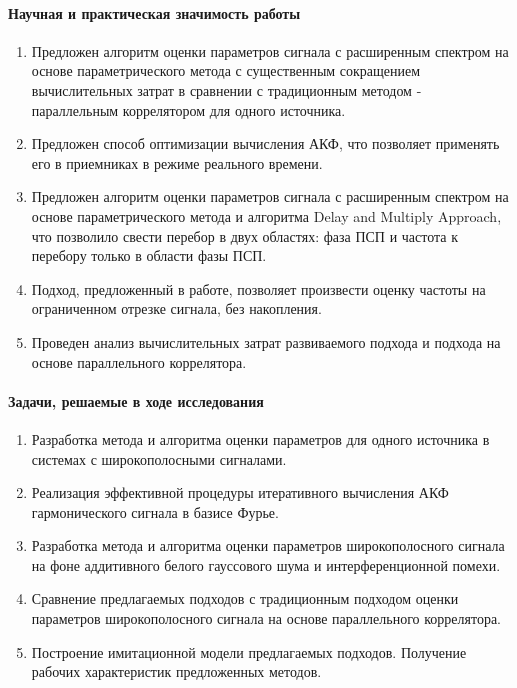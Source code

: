 \paragraph{Научная и практическая значимость работы}
\begin{enumerate}
	\item {Предложен алгоритм оценки параметров сигнала с расширенным спектром на основе параметрического метода с существенным
		сокращением вычислительных затрат в сравнении с традиционным методом - параллельным коррелятором для одного источника.}
	\item {Предложен способ оптимизации вычисления АКФ, что позволяет применять его в приемниках в режиме реального времени.}
	\item {Предложен алгоритм оценки параметров сигнала с расширенным спектром на основе параметрического метода и алгоритма Delay and Multiply Approach,
		что позволило свести перебор в двух областях: фаза ПСП и частота к перебору только в области фазы ПСП.}
	\item {Подход, предложенный в работе, позволяет произвести оценку частоты на ограниченном отрезке сигнала, без накопления.}
	\item {Проведен анализ вычислительных затрат развиваемого подхода и подхода на основе параллельного коррелятора.}
\end{enumerate}

\paragraph{Задачи, решаемые в ходе исследования}
\begin{enumerate}
	\item {Разработка метода и алгоритма оценки параметров для одного источника в системах с широкополосными сигналами.}
	\item {Реализация эффективной процедуры итеративного вычисления АКФ гармонического сигнала в базисе Фурье.}
	\item {Разработка метода и алгоритма оценки параметров широкополосного сигнала на фоне аддитивного белого гауссового шума и
		интерференционной помехи.}
	\item {Сравнение предлагаемых подходов с традиционным подходом оценки параметров широкополосного сигнала на основе параллельного коррелятора.}
	\item {Построение имитационной модели предлагаемых подходов. Получение рабочих характеристик предложенных методов.}
\end{enumerate}

